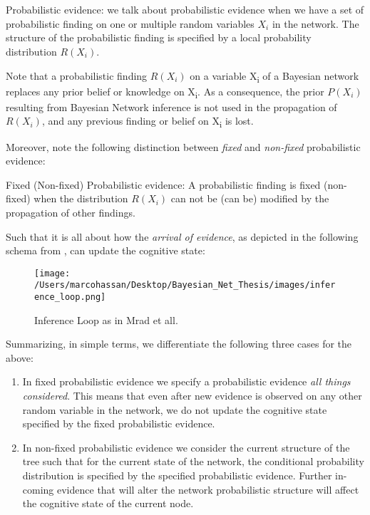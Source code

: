 \documentclass[11pt]{article}
\begin{document}
\begin{article}
\\\\

\begin{definition}
Probabilistic evidence: we talk about probabilistic evidence when we
have a set of probabilistic finding on one or multiple random variables $X_i$ in the network.
The structure of the probabilistic finding is specified by a local probability distribution $R(X_i)$.
\end{definition}  

Note that a probabilistic finding \(R(X_i)\) on a variable X\textsubscript{i} of a
Bayesian network replaces any prior belief or knowledge on X\textsubscript{i}. As
a consequence, the prior \(P (X_i)\) resulting from Bayesian Network
inference is not used in the propagation of \(R(X_i)\), and any
previous finding or belief on X\textsubscript{i} is lost.

Moreover, note the following distinction between \emph{fixed} and
\emph{non-fixed} probabilistic evidence:

\begin{definition}
Fixed (Non-fixed) Probabilistic evidence: A probabilistic finding
is fixed (non-fixed) when the distribution $R(X_i)$ can not be (can
be) modified by the propagation of other findings.
\end{definition}  

Such that it is all about how the \emph{arrival of evidence}, as depicted
in the following schema from \cite{Mrad_2015}, can update the
cognitive state:

\begin{figure}[htbp]
\centering
\texttt{[image: /Users/marcohassan/Desktop/Bayesian\_Net\_Thesis/images/inference\_loop.png]}
\caption{Inference Loop as in Mrad et all.}
\end{figure}


Summarizing, in simple terms, we differentiate the following three
cases for the above:

\begin{enumerate}
\item In fixed probabilistic evidence we specify a probabilistic evidence \emph{all things
considered}. This means that even after new evidence is observed
on any other random variable in the network, we do not update the
cognitive state specified by the fixed probabilistic evidence.

\item In non-fixed probabilistic evidence we consider the current
structure of the tree such that for the current state of the
network, the conditional probability distribution is specified by
the specified probabilistic evidence. Further in-coming evidence
that will alter the network probabilistic structure will affect
the cognitive state of the current node.


\end{enumerate}
\end{article}
\end{document}

